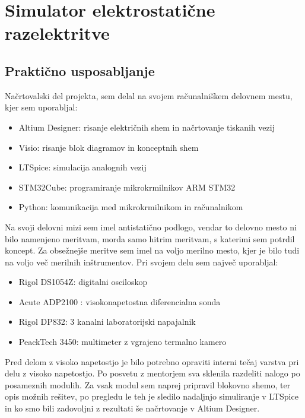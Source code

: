 \documentclass[a4paper,twoside,openright,12pt,Slovene]{book}
\begin{document}
\chapter{Simulator elektrostatične razelektritve} \label{ESDSIM}

	\section{Praktično usposabljanje}
	Načrtovalski del projekta, sem delal na svojem računalniškem delovnem mestu, kjer sem uporabljal:
	\begin{itemize}
		\item Altium Designer: risanje električnih shem in načrtovanje tiskanih vezij
		\item Visio: risanje blok diagramov in konceptnih shem
		\item LTSpice: simulacija analognih vezij
		\item STM32Cube: programiranje mikrokrmilnikov ARM STM32
		\item Python: komunikacija med mikrokrmilnikom in računalnikom
	\end{itemize}
	Na svoji delovni mizi sem imel antistatično podlogo, vendar to delovno mesto ni bilo namenjeno meritvam, morda samo hitrim meritvam, s katerimi sem potrdil koncept.
	Za obsežnejše meritve sem imel na voljo merilno mesto, kjer je bilo tudi na voljo več merilnih inštrumentov. Pri svojem delu sem največ uporabljal:
	\begin{itemize}
		\item Rigol DS1054Z: digitalni osciloskop
		\item Acute ADP2100 : visokonapetostna diferencialna sonda
		\item Rigol DP832: 3 kanalni laboratorijski napajalnik
		\item PeackTech 3450: multimeter z vgrajeno termalno kamero
	\end{itemize}
	Pred delom z visoko napetostjo je bilo potrebno opraviti interni tečaj varstva pri delu z visoko napetostjo. Po posvetu z mentorjem sva sklenila razdeliti nalogo po posameznih modulih. Za vsak modul sem naprej pripravil blokovno shemo, ter opis možnih rešitev, po pregledu le teh je sledilo nadaljnjo simuliranje v LTSpice in ko smo bili zadovoljni z rezultati še načrtovanje v Altium Designer.
	
\end{document}
